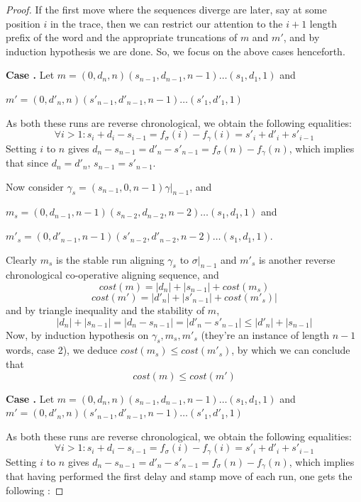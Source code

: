 \documentclass[conference]{IEEEtran}
\newcounter{cases}
\newcounter{subcases}[cases]
\newenvironment{mycase}
{
	\setcounter{cases}{0}
	\setcounter{subcases}{0}
	\newcommand{\case}
	{
		\par\indent\stepcounter{cases}\textbf{Case \thecases.}
	}
	\newcommand{\subcase}
	{
		\par\indent\stepcounter{subcases}\textbf{ \>\>\>\> Subcase (\thesubcases)}
	}
}
{
	\par
}
\renewcommand*\thecases{\arabic{cases}}
\renewcommand*\thesubcases{\alph{subcases}}
\begin{document}
\begin{proof}
\begin{mycase}
\end{mycase}

If the first move where the sequences diverge are later, say at some position $i$ in the trace, then we can restrict our attention to the $i+1$ length prefix of the word and the appropriate truncations of $m$ and $m'$, and by induction hypothesis we are done. 
So, we focus on the above cases henceforth. 

\begin{mycase}
\case Let $m = (0, d_n, n)(s_{n-1}, d_{n-1}, n-1) \dots (s_1, d_1, 1)$ and 

$m' = (0, d'_n, n)(s'_{n-1}, d'_{n-1}, n-1) \dots (s'_1, d'_1, 1)$ 

As both these runs are reverse chronological, we obtain the following equalities: $$\forall i > 1 : s_i + d_i - s_{i-1} = f_\sigma(i) - f_\gamma(i) = s'_i + d'_i + s'_{i-1}$$ 
Setting $i$ to $n$ gives $d_n - s_{n-1} = d'_n - s'_{n-1} = f_\sigma(n) - f_\gamma(n)$, which implies that  since $d_n = d'_n$, $s_{n-1} = s'_{n-1}$. 

Now consider $\gamma_s = (s_{n-1}, 0, n-1)\gamma|_{n-1}$, and 

$m_s = (0, d_{n-1}, n-1)(s_{n-2}, d_{n-2}, n-2)\dots (s_1, d_1, 1)$ and 

$m'_s = (0, d'_{n-1}, n-1)(s'_{n-2}, d'_{n-2}, n-2)\dots (s_1, d_1, 1)$. 

Clearly $m_s$ is the stable run aligning $\gamma_s$ to $\sigma|_{n-1}$ and $m'_s$ is another reverse chronological co-operative aligning sequence, and $$cost(m) = |d_n| + |s_{n-1}| + cost(m_s)$$ $$cost(m') = |d'_n| + |s'_{n-1}| + cost(m'_s)|$$ and by triangle inequality and the stability of $m$, $$|d_n| + |s_{n-1}| = |d_n - s_{n-1}| = |d'_n - s'_{n-1}| \leq |d'_n| + |s_{n-1}|$$ 
Now, by induction hypothesis on $\gamma_s, m_s, m'_s$ (they're an instance of length $n-1$ words, case 2),  we deduce $cost(m_s) \leq cost(m'_s)$, by which we can conclude that $$cost(m) \leq cost(m')$$

\case Let $m = {(0, d_n, n)(s_{n-1}, d_{n-1}, n-1) \dots (s_1, d_1, 1)}$ and 
$m' = (0, d'_n, n)(s'_{n-1}, d'_{n-1}, n-1) \dots (s'_1, d'_1, 1)$ 

As both these runs are reverse chronological, we obtain the following equalities: $$\forall i > 1 : s_i + d_i - s_{i-1} = f_\sigma(i) - f_\gamma(i) = s'_i + d'_i + s'_{i-1}$$ 
Setting $i$ to $n$ gives $d_n - s_{n-1} = d'_n - s'_{n-1} = f_\sigma(n) - f_\gamma(n)$, which implies that having performed the first delay and stamp move of each run, one gets the following :  


\end{mycase}
\end{proof}
\end{document}
